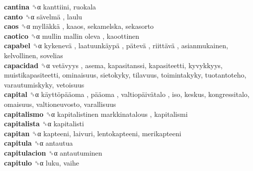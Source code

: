 \textbf{cantina} ␝α  kanttiini, ruokala  \\
\textbf{canto} ␝α   sävelmä , laulu  \\
\textbf{caos} ␝α   mylläkkä , kaaos, sekamelska, sekasorto  \\
\textbf{caotico} ␝α   mullin mallin oleva , kaoottinen  \\
\textbf{capabel} ␝α   kykenevä ,  laatuunkäypä ,  pätevä ,  riittävä , asianmukainen, kelvollinen, sovelias  \\
\textbf{capacidad} ␝α   vetävyys , asema, kapasitanssi, kapasiteetti, kyvykkyys, muistikapasiteetti, ominaisuus, sietokyky, tilavuus, toimintakyky, tuotantoteho, varautumiskyky, vetoisuus  \\
\textbf{capital} ␝α   käyttöpääoma ,  pääoma ,  valtiopäivätalo , iso, keskus, kongressitalo, omaisuus, valtioneuvosto, varallisuus  \\
\textbf{capitalismo} ␝α   kapitalistinen markkinatalous , kapitalismi  \\
\textbf{capitalista} ␝α  kapitalisti  \\
\textbf{capitan} ␝α  kapteeni, laivuri, lentokapteeni, merikapteeni  \\
\textbf{capitula} ␝α  antautua  \\
\textbf{capitulacion} ␝α  antautuminen  \\
\textbf{capitulo} ␝α  luku, vaihe  \\
